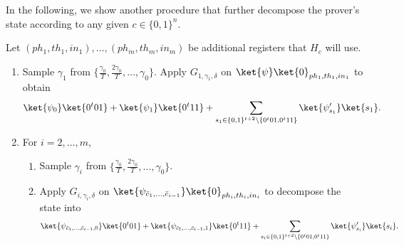 In the following, we show another procedure that further decompose the prover's state according to any given $c\in \{0,1\}^n$. 
\begin{algorithm}[h]
    \begin{mdframed}[style=figstyle,innerleftmargin=10pt,innerrightmargin=10pt]
    Let $(ph_1,th_1,in_1),\dots,(ph_m,th_m,in_m)$ be additional registers that $H_c$ will use. 
    \begin{enumerate}
        \item Sample $\gamma_1$ from $\{\frac{\gamma_0}{T},\frac{2\gamma_0}{T},\dots,\gamma_0\}$. Apply $G_{1,\gamma_1,\delta}$ on $\ket{\psi}\ket{0}_{ph_1,th_1,in_1}$ to obtain
    \begin{align*}
        \ket{\psi_0}\ket{0^t01}+ \ket{\psi_1}\ket{0^t11} + \sum_{s_1\in \{0,1\}^{t+2}\setminus \{0^t01,0^t11\}}\ket{\psi'_{s_1}}\ket{s_1}. 
    \end{align*}
    \item For $i=2,\dots,m$, 
    \begin{enumerate}
        \item Sample $\gamma_i$ from $\{\frac{\gamma_0}{T},\frac{2\gamma_0}{T},\dots,\gamma_0\}$. 
        \item Apply $G_{i,\gamma_i,\delta}$ on $\ket{\psi_{\bar{c}_1,\dots,\bar{c}_{i-1}}}\ket{0}_{ph_i,th_i,in_i}$ to decompose the state into
        \begin{align*}
            \ket{\psi_{\bar{c}_1,\dots,\bar{c}_{i-1},0}}\ket{0^t01}+ \ket{\psi_{\bar{c}_1,\dots,\bar{c}_{i-1},1}}\ket{0^t11} + \sum_{s_i\in \{0,1\}^{t+2}\setminus \{0^t01,0^t11\}}\ket{\psi'_{s_i}}\ket{s_i}.  
        \end{align*}
    \end{enumerate}
    \end{enumerate}

    \caption{$H_c$}
    \label{fig:process_H}
    \end{mdframed}
\end{algorithm}

